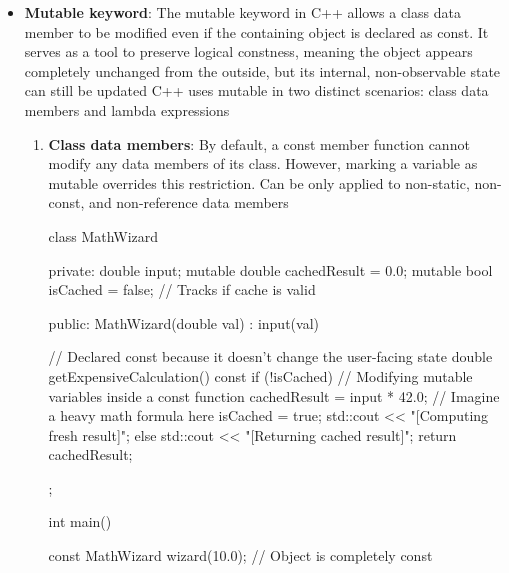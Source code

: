 \documentclass{report}
\begin{document}
\begin{itemize}
        \item \textbf{Mutable keyword}: The mutable keyword in C++ allows a class data member to be modified even if the containing object is declared as const. It serves as a tool to preserve logical constness, meaning the object appears completely unchanged from the outside, but its internal, non-observable state can still be updated
            \bigbreak \noindent 
            C++ uses mutable in two distinct scenarios: class data members and lambda expressions
            \begin{enumerate}
                \item \textbf{Class data members}: By default, a const member function cannot modify any data members of its class. However, marking a variable as mutable overrides this restriction. 
                    \bigbreak \noindent 
                    Can be only applied to non-static, non-const, and non-reference data members
                    \bigbreak \noindent 
                    \begin{cppcode}
                    class MathWizard {
                    private:
                        double input;
                        mutable double cachedResult = 0.0;
                        mutable bool isCached = false; // Tracks if cache is valid

                    public:
                        MathWizard(double val) : input(val) {}

                        // Declared const because it doesn't change the user-facing state
                        double getExpensiveCalculation() const {
                            if (!isCached) {
                                // Modifying mutable variables inside a const function
                                cachedResult = input * 42.0; // Imagine a heavy math formula here
                                isCached = true;
                                std::cout << "[Computing fresh result]\n";
                            } else {
                                std::cout << "[Returning cached result]\n";
                            }
                            return cachedResult;
                        }
                    };

                    int main() {
                        const MathWizard wizard(10.0); // Object is completely const

}
\end{cppcode}
\end{enumerate}
\end{itemize}
\end{document}

